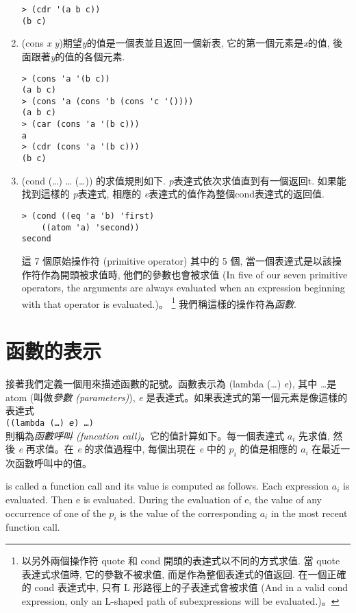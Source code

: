\documentclass[12pt]{article}
\begin{document}
\begin{CJK}{UTF8}{bsmi}
\begin{enumerate}
\begin{verbatim} 
> (cdr '(a b c)) 
(b c) 
\end{verbatim} 
\item 
(cons {\it x} {\it y})期望{\it y}的值是一個表並且返回一個新表, 它的第一個元素是{\it x}的值,
後面跟著{\it y}的值的各個元素. 
\begin{verbatim} 
> (cons 'a '(b c)) 
(a b c) 
> (cons 'a (cons 'b (cons 'c '()))) 
(a b c) 
> (car (cons 'a '(b c))) 
a 
> (cdr (cons 'a '(b c))) 
(b c) 
\end{verbatim} 
\item 
(cond 
(\pone\dots\eone) 
\dots 
(\pn\dots\en)) 
的求值規則如下. 
{\it p}表達式依次求值直到有一個返回t. 
如果能找到這樣的{\it 
p}表達式, 相應的{\it 
e}表達式的值作為整個cond表達式的返回值. 
\begin{verbatim} 
> (cond ((eq 'a 'b) 'first) 
    ((atom 'a) 'second)) 
second 
\end{verbatim} 
這 7 個原始操作符 (primitive operator) 其中的 5 個, 當一個表達式是以該操作符作為開頭被求值時, 他們的參數也會被求值
(In five of our seven primitive operators, the arguments are always evaluated 
when an expression beginning with that operator is evaluated.)。
\footnote{以另外兩個操作符 quote 和 cond 開頭的表達式以不同的方式求值.
當 quote 表達式求值時, 它的參數不被求值, 而是作為整個表達式的值返回. 
在一個正確的 cond 表達式中, 只有 L 形路徑上的子表達式會被求值
(And in a valid cond expression, only an L-shaped path of subexpressions will be evaluated.)。} 
我們稱這樣的操作符為{\em 函數}. 
\end{enumerate} 

\section{函數的表示} 


接著我們定義一個用來描述函數的記號。函數表示為
(lambda (\pone\dots\pn) {\it e}),
其中 \pone\dots\pn 是 atom (叫做{\em 參數 (parameters)}),
{\it e} 是表達式。如果表達式的第一個元素是像這樣的表達式\\
{\tt ((lambda (\pone\dots\pn) {\it e}) \aone\dots\an)} \\
則稱為{\em 函數呼叫 (funcation call)}。它的值計算如下。每一個表達式
{$a_{i}$} 先求值, 然後 {\it e} 再求值。在 {\it e}
的求值過程中, 每個出現在 {\it e} 中的 {$p_{i}$} 的值是相應的
{$a_{i}$} 在最近一次函數呼叫中的值。 

is called a function call and its value is computed as follows. Each expression
{$a_{i}$} is evaluated. Then e is evaluated. During the evaluation of e, the value of any occurrence of one of the {$p_{i}$} is the value of the corresponding {$a_{i}$} in the most
recent function call.


\end{CJK}
\end{document}
